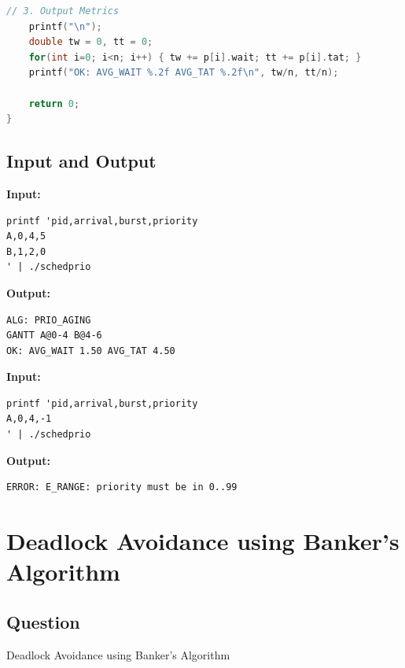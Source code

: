\documentclass[12pt,a4paper]{article}
\begin{document}
\begin{lstlisting}[language=C]
    // 3. Output Metrics
    printf("\n");
    double tw = 0, tt = 0;
    for(int i=0; i<n; i++) { tw += p[i].wait; tt += p[i].tat; }
    printf("OK: AVG_WAIT %.2f AVG_TAT %.2f\n", tw/n, tt/n);

    return 0;
}
\end{lstlisting}
\subsection{Input and Output}
\noindent\textbf{Input:}
\begin{verbatim}
printf 'pid,arrival,burst,priority
A,0,4,5
B,1,2,0
' | ./schedprio
\end{verbatim}
\vspace{0.5cm}
\noindent\textbf{Output:}
\begin{verbatim}
ALG: PRIO_AGING
GANTT A@0-4 B@4-6 
OK: AVG_WAIT 1.50 AVG_TAT 4.50
\end{verbatim}
\noindent\textbf{Input:}
\begin{verbatim}
printf 'pid,arrival,burst,priority
A,0,4,-1
' | ./schedprio
\end{verbatim}
\vspace{0.5cm}
\noindent\textbf{Output:}
\begin{verbatim}
ERROR: E_RANGE: priority must be in 0..99
\end{verbatim}
\newpage
\section{Deadlock Avoidance using Banker's Algorithm}
\subsection{Question}
Deadlock Avoidance using Banker's Algorithm
\end{document}
